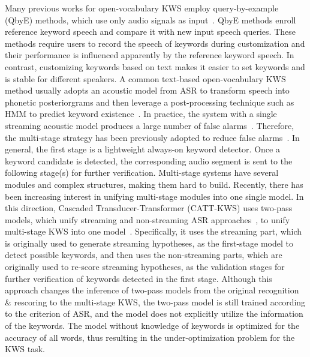 \documentclass{article}
\begin{document}

Many previous works for open-vocabulary KWS employ query-by-example (QbyE) methods, which use only audio signals as input~\cite{qbe1,qbe2}. QbyE methods enroll reference keyword speech and compare it with new input speech queries. These methods require users to record the speech of keywords during customization and their performance is influenced apparently by the reference keyword speech. In contrast, customizing keywords based on text makes it easier to set keywords and is stable for different speakers.
A common text-based open-vocabulary KWS method usually adopts an acoustic model from ASR to transform speech into phonetic posteriorgrams and then leverage a post-processing technique such as HMM to predict keyword existence~\cite{lstm-kws,am1,am2,am3}. In practice, the system with a single streaming acoustic model produces a large number of false alarms~\cite{liu2021rnn,tian2021improving}.
Therefore, the multi-stage strategy has been previously adopted to reduce false alarms~\cite{liu2021rnn,2020Multi, yang2021keyword,sigtia2021progressive}. In general, the first stage is a lightweight always-on keyword detector. Once a keyword candidate is detected, the corresponding audio segment is sent to the following stage(s) for further verification.
Multi-stage systems have several modules and complex structures, making them hard to build. Recently, there has been increasing interest in unifying multi-stage modules into one single model. In this direction, Cascaded Transducer-Transformer (CATT-KWS) uses two-pass models, which unify streaming and non-streaming ASR approaches~\cite{U2,unify2}, to unify multi-stage KWS into one model~\cite{catt}. Specifically, it uses the streaming part, which is originally used to generate streaming hypotheses, as the first-stage model to detect possible keywords, and then uses the non-streaming parts, which are originally used to re-score streaming hypotheses, as the validation stages for further verification of keywords detected in the first stage. Although this approach changes the inference of two-pass models from the original recognition \& rescoring to the multi-stage KWS, the two-pass model is still trained according to the criterion of ASR, and the model does not explicitly utilize the information of the keywords. The model without knowledge of keywords is optimized for the accuracy of all words, thus resulting in the under-optimization problem for the KWS task.
\end{document}
